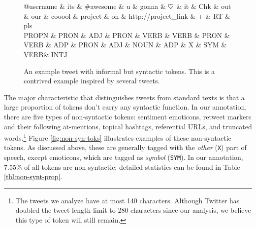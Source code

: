 \documentclass[11pt,a4paper]{article}
\newcommand{\heart}{\ensuremath\heartsuit}
\newcommand{\yjcomment}[1]{\textcolor{orange}{[$_\mathrm{L}^\mathrm{Y}$#1]}}
\begin{document}
\begin{figure}[t]
	\centering
	\small
	\begin{dependency}[edge slant=2, text only label, label style=above]
		\begin{deptext}
			@username \& its \& \#awesome \& u \& gonna \& $\heart$ \& it \& Chk \& out \& our \& cooool \& project \& on \& http://project\_link \& + \& RT \& pls\\
			\tiny PROPN \& \tiny PRON \& \tiny ADJ \& \tiny PRON \& \tiny VERB \& \tiny VERB \& \tiny PRON \& \tiny VERB \& \tiny ADP \& \tiny PRON \& \tiny ADJ \& \tiny NOUN \& \tiny ADP \& \tiny X \& \tiny SYM \& \tiny VERB\& \tiny INTJ\\
		\end{deptext}
	\end{dependency}
	\caption{An example tweet with informal but syntactic tokens.
		This is a contrived example inspired by several tweets.}\label{fig:informal-toks}
\end{figure}

The major characteristic that distinguishes tweets from standard texts is that
a large proportion of tokens don't carry any syntactic function.
In our annotation, there are five types of non-syntactic tokens: 
sentiment emoticons, retweet markers and their following at-mentions, topical hashtags, referential URLs, and
truncated words.\footnote{The tweets we analyze have at most 140
  characters. Although Twitter has doubled the tweet length limit to
  280 characters since our analysis, we believe this type of token
  will still remain.}  Figure \ref{fig:non-syn-toks} illustrates examples of
these non-syntactic tokens.  As discussed above, these are generally
tagged with the \emph{other} (\texttt{X}) part of speech, except
emoticons, which are tagged as \emph{symbol} (\texttt{SYM}).  In our annotation, 
7.55\% of all tokens are non-syntactic; detailed statistics can be found in Table \ref{tbl:non-synt-prop}.
\end{document}
